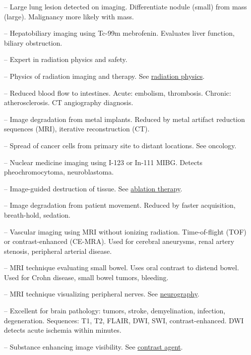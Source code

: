 -- Large lung lesion detected on imaging. Differentiate nodule (small) from mass (large). Malignancy more likely with mass.

-- Hepatobiliary imaging using Tc-99m mebrofenin. Evaluates liver function, biliary obstruction.

-- Expert in radiation physics and safety.

-- Physics of radiation imaging and therapy. See \hyperlink{Radiation Physics}{radiation physics}.

-- Reduced blood flow to intestines. Acute: embolism, thrombosis. Chronic: atherosclerosis. CT angiography diagnosis.

-- Image degradation from metal implants. Reduced by metal artifact reduction sequences (MRI), iterative reconstruction (CT).

-- Spread of cancer cells from primary site to distant locations. See oncology.

-- Nuclear medicine imaging using I-123 or In-111 MIBG. Detects pheochromocytoma, neuroblastoma.

-- Image-guided destruction of tissue. See \hyperlink{Ablation Therapy}{ablation therapy}.

-- Image degradation from patient movement. Reduced by faster acquisition, breath-hold, sedation.

-- Vascular imaging using MRI without ionizing radiation. Time-of-flight (TOF) or contrast-enhanced (CE-MRA). Used for cerebral aneurysms, renal artery stenosis, peripheral arterial disease.

-- MRI technique evaluating small bowel. Uses oral contrast to distend bowel. Used for Crohn disease, small bowel tumors, bleeding.

-- MRI technique visualizing peripheral nerves. See \hyperlink{Neurography}{neurography}.

-- Excellent for brain pathology: tumors, stroke, demyelination, infection, degeneration. Sequences: T1, T2, FLAIR, DWI, SWI, contrast-enhanced. DWI detects acute ischemia within minutes.

-- Substance enhancing image visibility. See \hyperlink{Contrast Agent}{contrast agent}.

